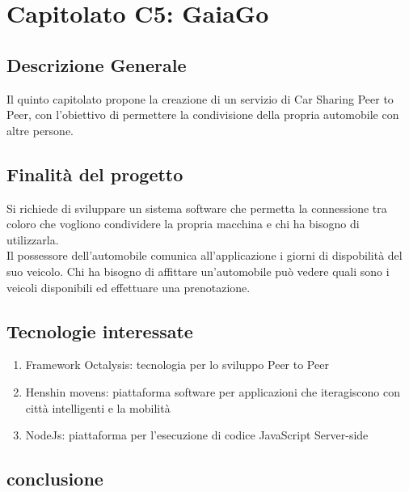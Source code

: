 \chapter{Capitolato C5: GaiaGo}
\section{Descrizione Generale}

Il quinto capitolato propone la creazione di un servizio di Car Sharing Peer to Peer, con l'obiettivo di permettere la condivisione della propria automobile con altre persone.\\


\section{Finalit\`a del progetto}
Si richiede di sviluppare un sistema software che permetta la connessione tra coloro che vogliono condividere la propria macchina e chi ha bisogno di utilizzarla.\\
Il possessore dell'automobile comunica all'applicazione i giorni di dispobilit\`a del suo veicolo.
Chi ha bisogno di affittare un'automobile può vedere quali sono i veicoli disponibili ed effettuare una prenotazione.

\section{Tecnologie interessate}
\begin{enumerate}
\item Framework Octalysis: tecnologia per lo sviluppo Peer to Peer
\item Henshin movens: piattaforma software per applicazioni che iteragiscono con città intelligenti e la mobilità
\item NodeJs: piattaforma per l'esecuzione di codice JavaScript Server-side
\end{enumerate}
\section{conclusione}

